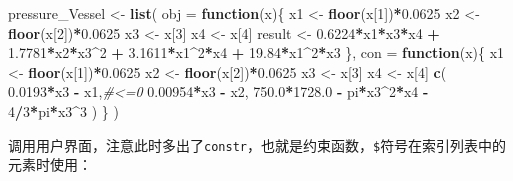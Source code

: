 \documentclass[]{ctexbook}
\newenvironment{Shaded}{\begin{snugshade}}{\end{snugshade}}
\newcommand{\KeywordTok}[1]{\textcolor[rgb]{0.13,0.29,0.53}{\textbf{#1}}}
\newcommand{\DataTypeTok}[1]{\textcolor[rgb]{0.13,0.29,0.53}{#1}}
\newcommand{\DecValTok}[1]{\textcolor[rgb]{0.00,0.00,0.81}{#1}}
\newcommand{\FloatTok}[1]{\textcolor[rgb]{0.00,0.00,0.81}{#1}}
\newcommand{\StringTok}[1]{\textcolor[rgb]{0.31,0.60,0.02}{#1}}
\newcommand{\CommentTok}[1]{\textcolor[rgb]{0.56,0.35,0.01}{\textit{#1}}}
\newcommand{\ControlFlowTok}[1]{\textcolor[rgb]{0.13,0.29,0.53}{\textbf{#1}}}
\newcommand{\OperatorTok}[1]{\textcolor[rgb]{0.81,0.36,0.00}{\textbf{#1}}}
\newcommand{\NormalTok}[1]{#1}
\theoremstyle{definition}
\theoremstyle{definition}
\theoremstyle{definition}
\theoremstyle{remark}
\begin{document}
\begin{Shaded}
\begin{Highlighting}[]
\NormalTok{pressure_Vessel <-}\StringTok{ }\KeywordTok{list}\NormalTok{(}
  \DataTypeTok{obj =} \ControlFlowTok{function}\NormalTok{(x)\{}
\NormalTok{    x1 <-}\StringTok{ }\KeywordTok{floor}\NormalTok{(x[}\DecValTok{1}\NormalTok{])}\OperatorTok{*}\FloatTok{0.0625}
\NormalTok{    x2 <-}\StringTok{ }\KeywordTok{floor}\NormalTok{(x[}\DecValTok{2}\NormalTok{])}\OperatorTok{*}\FloatTok{0.0625}
\NormalTok{    x3 <-}\StringTok{ }\NormalTok{x[}\DecValTok{3}\NormalTok{]}
\NormalTok{    x4 <-}\StringTok{ }\NormalTok{x[}\DecValTok{4}\NormalTok{]}
\NormalTok{    result <-}\StringTok{ }\FloatTok{0.6224}\OperatorTok{*}\NormalTok{x1}\OperatorTok{*}\NormalTok{x3}\OperatorTok{*}\NormalTok{x4 }\OperatorTok{+}\StringTok{ }
\StringTok{      }\FloatTok{1.7781}\OperatorTok{*}\NormalTok{x2}\OperatorTok{*}\NormalTok{x3}\OperatorTok{^}\DecValTok{2} \OperatorTok{+}
\StringTok{      }\FloatTok{3.1611}\OperatorTok{*}\NormalTok{x1}\OperatorTok{^}\DecValTok{2}\OperatorTok{*}\NormalTok{x4 }\OperatorTok{+}\StringTok{ }
\StringTok{      }\FloatTok{19.84}\OperatorTok{*}\NormalTok{x1}\OperatorTok{^}\DecValTok{2}\OperatorTok{*}\NormalTok{x3}
\NormalTok{  \},}
  \DataTypeTok{con =} \ControlFlowTok{function}\NormalTok{(x)\{}
\NormalTok{    x1 <-}\StringTok{ }\KeywordTok{floor}\NormalTok{(x[}\DecValTok{1}\NormalTok{])}\OperatorTok{*}\FloatTok{0.0625}
\NormalTok{    x2 <-}\StringTok{ }\KeywordTok{floor}\NormalTok{(x[}\DecValTok{2}\NormalTok{])}\OperatorTok{*}\FloatTok{0.0625}
\NormalTok{    x3 <-}\StringTok{ }\NormalTok{x[}\DecValTok{3}\NormalTok{]}
\NormalTok{    x4 <-}\StringTok{ }\NormalTok{x[}\DecValTok{4}\NormalTok{]}
    \KeywordTok{c}\NormalTok{(}
      \FloatTok{0.0193}\OperatorTok{*}\NormalTok{x3 }\OperatorTok{-}\StringTok{ }\NormalTok{x1,}\CommentTok{#<=0}
      \FloatTok{0.00954}\OperatorTok{*}\NormalTok{x3 }\OperatorTok{-}\StringTok{ }\NormalTok{x2,}
      \FloatTok{750.0}\OperatorTok{*}\FloatTok{1728.0} \OperatorTok{-}\StringTok{ }\NormalTok{pi}\OperatorTok{*}\NormalTok{x3}\OperatorTok{^}\DecValTok{2}\OperatorTok{*}\NormalTok{x4 }\OperatorTok{-}\StringTok{ }\DecValTok{4}\OperatorTok{/}\DecValTok{3}\OperatorTok{*}\NormalTok{pi}\OperatorTok{*}\NormalTok{x3}\OperatorTok{^}\DecValTok{3}
\NormalTok{    )}
\NormalTok{  \}}
\NormalTok{)}
\end{Highlighting}
\end{Shaded}

调用用户界面，注意此时多出了\texttt{constr}，也就是约束函数，\texttt{\$}符号在索引列表中的元素时使用：
\end{document}
